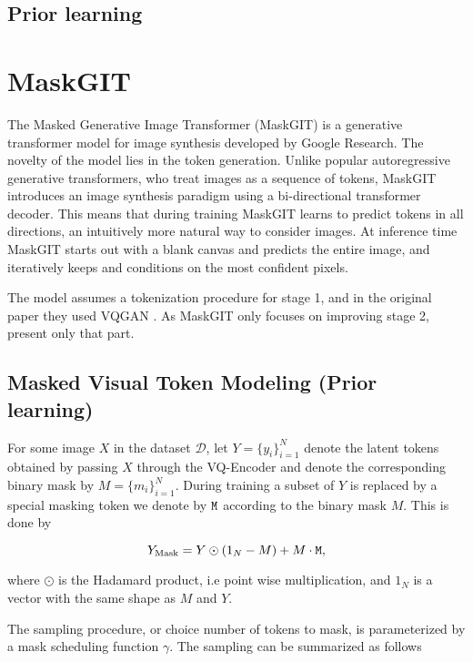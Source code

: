 \documentclass[../../thesis.tex]{subfiles}
\begin{document}
\subsection{Prior learning}

\section{MaskGIT}

The Masked Generative Image Transformer (MaskGIT) is a generative transformer model for image synthesis developed by Google Research. The novelty of the model lies in the token generation. Unlike popular autoregressive generative transformers, who treat images as a sequence of tokens, MaskGIT introduces an image synthesis paradigm using a bi-directional transformer decoder. This means that during training MaskGIT learns to predict tokens in all directions, an intuitively more natural way to consider images. At inference time MaskGIT starts out with a blank canvas and predicts the entire image, and iteratively keeps and conditions on the most confident pixels.\newline

The model assumes a tokenization procedure for stage 1, and in the original paper they used VQGAN \cite{VQGAN}. As MaskGIT only focuses on improving stage 2, present only that part. 

\subsection{Masked Visual Token Modeling (Prior learning)}

For some image $X$ in the dataset $\mathcal{D}$, let $Y = \{y_i\}_{i=1}^N$ denote the latent tokens obtained by passing $X$ through the VQ-Encoder and denote the corresponding binary mask by $M = \{m_i\}_{i=1}^N$. During training a subset of $Y$ is replaced by a special masking token we denote by $\texttt{M}$ according to the binary mask $M$. This is done by 

\begin{equation}
    Y_\text{Mask} = Y\odot (1_N-M) +  M\cdot\texttt{M},
\end{equation}

where $\odot$ is the Hadamard product, i.e point wise multiplication, and $1_N$ is a vector with the same shape as $M$ and $Y$.\newline

The sampling procedure, or choice number of tokens to mask, is parameterized by a mask scheduling function $\gamma$. The sampling can be summarized as follows
\end{document}
